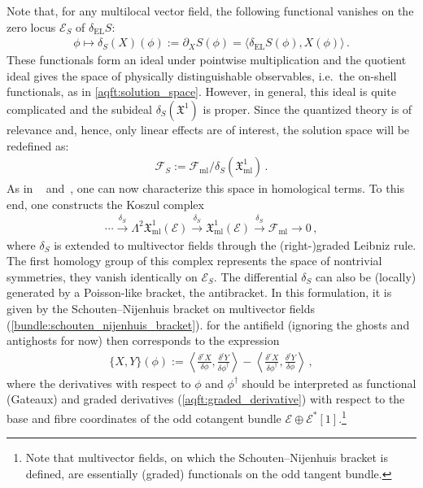     Note that, for any multilocal vector field, the following functional vanishes on the zero locus $\mathcal{E}_S$ of $\delta_{\text{EL}}S$:
    \begin{gather}
        \phi\mapsto\delta_S(X)(\phi):=\partial_XS(\phi)=\langle\delta_{\text{EL}}S(\phi),X(\phi)\rangle\,.
    \end{gather}
    These functionals form an ideal under pointwise multiplication and the quotient ideal gives the space of physically distinguishable observables, i.e.~the on-shell functionals, as in \cref{aqft:solution_space}. However, in general, this ideal is quite complicated and the subideal $\delta_S(\mathfrak{X}^1)$ is proper. Since the quantized theory is of relevance and, hence, only linear effects are of interest, the solution space will be redefined as:
    \begin{gather}
        \mathcal{F}_S := \mathcal{F}_{\text{ml}}/\delta_S(\mathfrak{X}^1_{\text{ml}})\,.
    \end{gather}
    As in ~ and~, one can now characterize this space in homological terms. To this end, one constructs the Koszul complex
    \begin{gather}
        \cdots\overset{\delta_S}{\longrightarrow}\Lambda^2\mathfrak{X}^1_{\text{ml}}(\mathcal{E})\overset{\delta_S}{\longrightarrow}\mathfrak{X}^1_{\text{ml}}(\mathcal{E})\overset{\delta_S}{\longrightarrow}\mathcal{F}_{\text{ml}}\longrightarrow0\,,
    \end{gather}
    where $\delta_S$ is extended to multivector fields through the (right-)graded Leibniz rule. The first homology group of this complex represents the space of nontrivial symmetries, they vanish identically on $\mathcal{E}_S$. The differential $\delta_S$ can also be (locally) generated by a Poisson-like bracket, the antibracket. In this formulation, it is given by the Schouten--Nijenhuis bracket on multivector fields (\cref{bundle:schouten_nijenhuis_bracket}).  for the antifield (ignoring the ghosts and antighosts for now) then corresponds to the expression
    \begin{gather}
        \{X,Y\}(\phi) := \left\langle\frac{\delta^rX}{\delta\phi},\frac{\delta^lY}{\delta\phi^\dagger}\right\rangle - \left\langle\frac{\delta^rX}{\delta\phi^\dagger},\frac{\delta^lY}{\delta\phi}\right\rangle\,,
    \end{gather}
    where the derivatives with respect to $\phi$ and $\phi^\dagger$ should be interpreted as functional (Gateaux) and graded derivatives (\cref{aqft:graded_derivative}) with respect to the base and fibre coordinates of the odd cotangent bundle $\mathcal{E}\oplus\mathcal{E}^*[1]$.\footnote{Note that multivector fields, on which the Schouten--Nijenhuis bracket is defined, are essentially (graded) functionals on the odd tangent bundle.}

